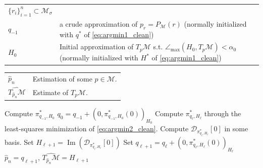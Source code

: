 \documentclass[12pt]{article}
\theoremstyle{remark}
\newcommand{\MM}{\mathcal{M}}
\newcommand{\DD}{\mathcal{D}}
\DeclareMathOperator{\Ima}{Im}
\newcommand{\mycomment}[1]{
	\textcolor{red}{Comment: #1}%
}
\newcommand{\barak}[1]{
	\textcolor{blue}{#1}%
}%
\begin{document}
\begin{algorithm}[H]
	\caption{Step 2: in practice}
	\label{alg:step2InPractice_clean}
	\begin{algorithmic}[1]
		\begin{tabular}[t]{ll}
            $\{r_i\}_{i=1}^n\subset \MM_\sigma$ \\
            $q_{-1}$ & a crude approximation of $p_r = P_\MM(r)$ (normally initialized with $q^*$ of \eqref{eq:argmin1_clean})\\
			$H_0$ & Initial approximation of $T_{p}\MM$ s.t. $\angle_{\max}(H_0,T_{p}\MM) < \alpha_0$ (normally initialized with $H^*$ of \eqref{eq:argmin1_clean})\\
		\end{tabular}
		\begin{tabular}[t]{ll}
				$\hat p_n$ & Estimation of some $p\in\MM$.\\
				$\widehat{T_{\hat p_n}\MM}$ & Estimate of  $T_p\MM$.\\
		\end{tabular}
		
		\State Compute $\pi^*_{q_{-1}, H_0}$
		\State $q_0 = q_{-1} + (0,\pi^*_{q_{-1}, H_0}(0))_{H_0}$ 
        \Repeat %
        \State Compute $\pi^*_{q_\ell,H_{\ell}}$ through the least-squares minimization of \eqref{eq:argmin2_clean}.
        \State Compute $\DD_{\pi^*_{q_\ell,H_{\ell}}}[0]$ in some basis.
        \State Set $H_{\ell + 1} = \Ima(\DD_{\pi^*_{q_\ell,H_{\ell}}}[0])$
        \State Set $q_{\ell+1} = q_\ell + (0, \pi^*_{q_\ell,H_{\ell}}(0))_{H_\ell}$
		\State \Return $\hat p_n = q_{\ell+1}$,  $\widehat{T_{\hat p_n}\MM} = H_{\ell+1} $
	\end{algorithmic}
\end{algorithm}

\end{document}
